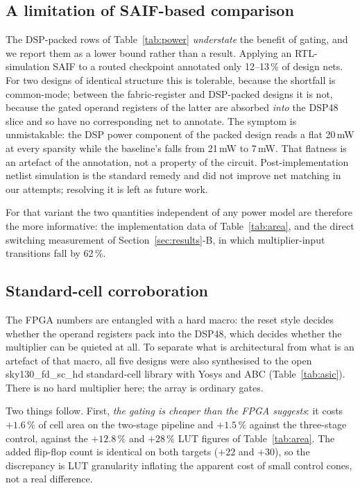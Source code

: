 \documentclass[journal,twocolumn]{IEEEtran}
\begin{document}




\subsection{A limitation of SAIF-based comparison}
The DSP-packed rows of Table~\ref{tab:power} \emph{understate} the benefit of
gating, and we report them as a lower bound rather than a result. Applying an
RTL-simulation SAIF to a routed checkpoint annotated only 12--13\,\% of design
nets. For two designs of identical structure this is tolerable, because the
shortfall is common-mode; between the fabric-register and DSP-packed designs
it is not, because the gated operand registers of the latter are absorbed
\emph{into} the DSP48 slice and so have no corresponding net to annotate. The
symptom is unmistakable: the DSP power component of the packed design reads a
flat 20\,mW at every sparsity while the baseline's falls from 21\,mW to 7\,mW.
That flatness is an artefact of the annotation, not a property of the circuit.
Post-implementation netlist simulation is the standard remedy and did not
improve net matching in our attempts; resolving it is left as future work.

For that variant the two quantities independent of any power model are
therefore the more informative: the implementation data of
Table~\ref{tab:area}, and the direct switching measurement of
Section~\ref{sec:results}-B, in which multiplier-input transitions fall by
62\,\%.

\subsection{Standard-cell corroboration}
The FPGA numbers are entangled with a hard macro: the reset style decides
whether the operand registers pack into the DSP48, which decides whether the
multiplier can be quieted at all. To separate what is architectural from what
is an artefact of that macro, all five designs were also synthesised to the
open sky130\_fd\_sc\_hd standard-cell library with Yosys and ABC
(Table~\ref{tab:asic}). There is no hard multiplier here; the array is
ordinary gates.



Two things follow. First, \emph{the gating is cheaper than the FPGA suggests}:
it costs $+1.6\,\%$ of cell area on the two-stage pipeline and $+1.5\,\%$
against the three-stage control, against the $+12.8\,\%$ and $+28\,\%$ LUT
figures of Table~\ref{tab:area}. The added flip-flop count is identical on
both targets ($+22$ and $+30$), so the discrepancy is LUT granularity
inflating the apparent cost of small control cones, not a real difference.
\end{document}
